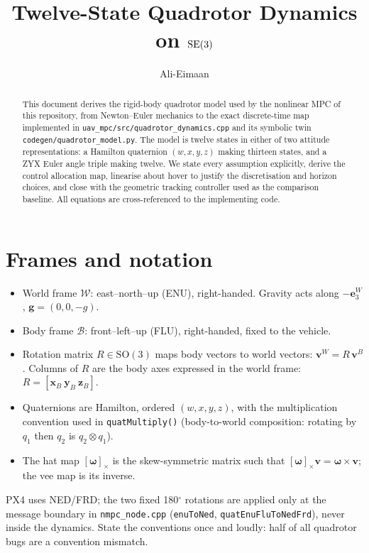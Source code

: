 \documentclass[11pt]{article}
\title{Twelve-State Quadrotor Dynamics on $\mathrm{SE}(3)$}
\author{Ali-Eimaan}
\date{}
\newcommand{\SO}{\mathrm{SO}(3)}
\newcommand{\skewm}[1]{\left[#1\right]_\times}
\newcommand{\quatmul}{\otimes}
\begin{document}
\maketitle

\begin{abstract}
This document derives the rigid-body quadrotor model used by the nonlinear MPC of this
repository, from Newton--Euler mechanics to the exact discrete-time map implemented in
\texttt{uav\_mpc/src/quadrotor\_dynamics.cpp} and its symbolic twin
\texttt{codegen/quadrotor\_model.py}. The model is twelve states in either of two attitude
representations: a Hamilton quaternion $(w,x,y,z)$ making thirteen states, and a ZYX Euler
angle triple making twelve. We state every assumption explicitly, derive the control
allocation map, linearise about hover to justify the discretisation and horizon choices, and
close with the geometric tracking controller used as the comparison baseline. All equations
are cross-referenced to the implementing code.
\end{abstract}

\tableofcontents

\section{Frames and notation}

\begin{itemize}
  \item World frame $\mathcal{W}$: east--north--up (ENU), right-handed. Gravity acts along
        $-\bm e_3^W$, $\bm g = (0, 0, -g)$.
  \item Body frame $\mathcal{B}$: front--left--up (FLU), right-handed, fixed to the vehicle.
  \item Rotation matrix $R \in \SO$ maps body vectors to world vectors:
        $\bm v^W = R \, \bm v^B$. Columns of $R$ are the body axes expressed in the world
        frame: $R = [\bm x_B \ \bm y_B \ \bm z_B]$.
  \item Quaternions are Hamilton, ordered $(w, x, y, z)$, with the multiplication
        convention used in \texttt{quatMultiply()} (body-to-world composition: rotating by
        $q_1$ then $q_2$ is $q_2 \quatmul q_1$).
  \item The hat map $\skewm{\bm\omega}$ is the skew-symmetric matrix such that
        $\skewm{\bm\omega} \bm v = \bm\omega \times \bm v$; the vee map is its inverse.
\end{itemize}

PX4 uses NED/FRD; the two fixed 180$^\circ$ rotations are applied only at the message
boundary in \texttt{nmpc\_node.cpp} (\texttt{enuToNed}, \texttt{quatEnuFluToNedFrd}), never
inside the dynamics. State the conventions once and loudly: half of all quadrotor bugs are a
convention mismatch.
\end{document}
